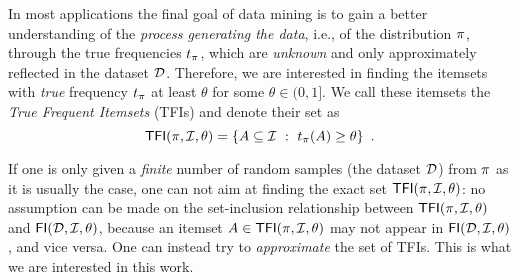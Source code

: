 In most applications the final goal of data mining is to gain a better
understanding of the \emph{process generating the data}, i.e., of the
distribution $\pi$, through the true frequencies $t_\pi$, which are
\emph{unknown} and only approximately reflected in the dataset ${\cal D}$. Therefore, %
we are interested in finding the itemsets with \emph{true} frequency
$t_\pi$ at least $\theta$ for some $\theta\in(0,1]$. We call these itemsets the
\emph{True Frequent Itemsets} (TFIs) and denote their set as %
\[
\mathsf{TFI}(\pi,{\cal I},\theta)=\{A\subseteq{\cal I} ~:~ t_\pi(A)\ge\theta\}\enspace.\]

If one is only given a \emph{finite} number of random
samples (the dataset ${\cal D}$) from $\pi$ as it is usually the case, one can not
aim at finding the exact set $\mathsf{TFI}(\pi,{\cal I},\theta)$: no assumption can be
made on the set-inclusion relationship between $\mathsf{TFI}(\pi,{\cal I},\theta)$ and
$\mathsf{FI}({\cal D},{\cal I},\theta)$,
because an itemset $A\in\mathsf{TFI}(\pi,{\cal I},\theta)$ may not appear in
$\mathsf{FI}({\cal D},{\cal I},\theta)$, and vice versa. One can instead try
to \emph{approximate} the set of TFIs. This is what we are interested in this
work.

